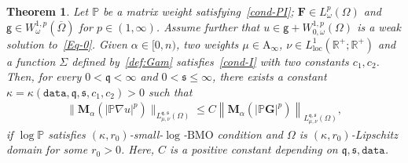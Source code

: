 \documentclass[a4paper, 11pt]{article}
\newtheorem{theorem}{Theorem}[section]
\begin{document}
\begin{theorem}\label{theo:C}
Let $\mathbb{P}$ be a matrix weight satisfying~\eqref{cond-PI}; $\mathbf{F} \in L^{p}_{\omega}(\Omega)$ and $\mathsf{g} \in W^{1,p}_{\omega}(\overline{\Omega})$ for $p \in (1,\infty)$. Assume further that $u \in \mathsf{g} + W^{1,p}_{0,\omega}(\Omega)$ is a weak solution to~\eqref{Eq-0}. Given $\alpha \in [0,n)$, two weights $\mu \in \mathrm{A}_{\infty}$, $\nu \in L^1_{\mathrm{loc}}(\mathbb{R}^+;\mathbb{R}^+)$ and a function $\Sigma$ defined by~\eqref{def:Gam} satisfies~\eqref{cond-I} with two constants $c_1, c_2$. Then, for every $0<\mathfrak{q}<\infty$ and $0<\mathfrak{s}\le\infty$, there exists a constant $\kappa = \kappa(\mathtt{data},\mathfrak{q},\mathfrak{s},c_1,c_2)>0$ such that 
\begin{align}\label{est:theo-C}
\|\mathbf{M}_{\alpha}(|\mathbb{P}\nabla u|^{p})\|_{L^{\mathfrak{q},\mathfrak{s}}_{\mu,\nu}(\Omega)}  \le C\left\|\mathbf{M}_{\alpha}(|\mathbb{P}\mathbf{G}|^{p})\right\|_{L^{\mathfrak{q},\mathfrak{s}}_{\mu,\nu}(\Omega)},
\end{align}
 if $\log \mathbb{P}$ satisfies $(\kappa,r_0)$-small-$\log$-$\mathrm{BMO}$ condition and $\Omega$ is $(\kappa,r_0)$-Lipschitz domain for some $r_0>0$. Here, $C$ is a positive constant depending on $\mathfrak{q},\mathfrak{s},\mathtt{data}$.
\end{theorem}
\end{document}
